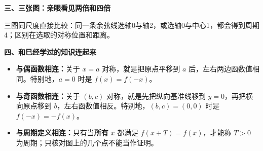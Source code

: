 \clearpage
\begin{explanationbox}
\textbf{\textcolor{CExplanation}{三、三张图：亲眼看见两倍和四倍}}



三图同尺度直接比较：同一条余弦线选轴0与轴2，或选轴0与中心1，都会得到周期4；区别在选取的对称位置和距离。


\end{explanationbox}
\clearpage
\begin{explanationbox}
\textbf{\textcolor{CExplanation}{四、和已经学过的知识连起来}}


\begin{itemize}[leftmargin=*,itemsep=0.35em]
\item \textbf{与偶函数相连：}关于 $x=a$ 对称，就是把原点平移到 $a$ 后，左右两边函数值相同。特别地，$a=0$ 时是 $f(x)=f(-x)$。
\item \textbf{与奇函数相连：}关于 $(b,c)$ 对称，就是先把纵向基准线移到 $y=0$，再把横向原点移到 $b$，左右函数值相反。特别地，$(b,c)=(0,0)$ 时是 $f(-x)=-f(x)$。
\item \textbf{与周期定义相连：}只有当\textbf{所有} $x$ 都满足 $f(x+T)=f(x)$，才能称 $T>0$ 为周期；只核对图上的几个点不能当作证明。
\end{itemize}
\end{explanationbox}
